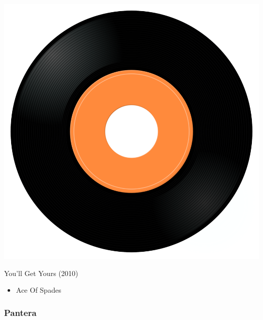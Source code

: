 \begin{minipage}[t]{0.25\textwidth}
\captionsetup{type=figure}
\includegraphics[width=\textwidth]{Images/cover.png}
\caption*{You'll Get Yours (2010)}
\end{minipage}
\begin{minipage}[t]{0.25\textwidth}\vspace{0pt}
\begin{itemize}[nosep,leftmargin=1em,labelwidth=*,align=left]
	\setlength{\itemsep}{0pt}
	\item Ace Of Spades
\end{itemize}
\end{minipage}

\subsubsection{Pantera}

